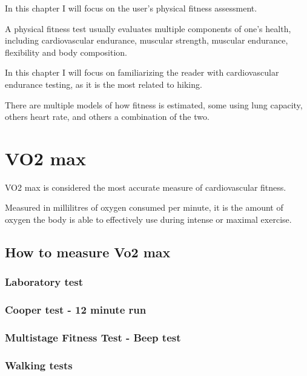 In this chapter I will focus on the user's physical fitness assessment.

A physical fitness test usually evaluates multiple components of one's health, including cardiovascular endurance, muscular strength, muscular endurance, flexibility and body composition.

In this chapter I will focus on familiarizing the reader with cardiovascular endurance testing, as it is the most related to hiking.

There are multiple models of how fitness is estimated, some using lung capacity, others heart rate, and others a combination of the two.

\section{VO2 max}
VO2 max is considered the most accurate measure of cardiovascular fitness.

Measured in millilitres of oxygen consumed per minute, it is the amount of oxygen the body is able to effectively use during intense or maximal exercise.\cite{vo2max-definition}

\subsection{How to measure Vo2 max}

\subsubsection*{Laboratory test}
\subsubsection*{Cooper test - 12 minute run}
\subsubsection*{Multistage Fitness Test - Beep test}
\subsubsection*{Walking tests}